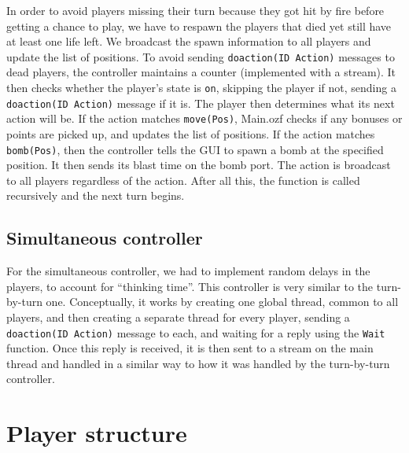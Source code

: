 \documentclass[12pt,journal]{IEEEtran}
\newcommand{\ntt}{\normalfont\ttfamily}
\newcommand{\fn}[1]{{\protect\ntt#1}}
\begin{document}
In order to avoid players missing their turn because they got hit by fire before getting a chance to play, we have to respawn the players that died yet still have at least one life left.
We broadcast the spawn information to all players and update the list of positions.
To avoid sending \lstinline|doaction(ID Action)| messages to dead players, the controller maintains a counter (implemented with a stream).
It then checks whether the player's state is \lstinline|on|, skipping the player if not, sending a \lstinline|doaction(ID Action)| message if it is.
The player then determines what its next action will be.
If the action matches \lstinline|move(Pos)|, \fn{Main.ozf} checks if any bonuses or points are picked up, and updates the list of positions.
If the action matches \lstinline|bomb(Pos)|, then the controller tells the GUI to spawn a bomb at the specified position.
It then sends its blast time on the bomb port.
The action is broadcast to all players regardless of the action.
After all this, the function is called recursively and the next turn begins.

\subsection{Simultaneous controller}
For the simultaneous controller, we had to implement random delays in the players, to account for ``thinking time''.
This controller is very similar to the turn-by-turn one.
Conceptually, it works by creating one global thread, common to all players, and then creating a separate thread for every player, sending a \lstinline|doaction(ID Action)| message to each, and waiting for a reply using the \lstinline|Wait| function.
Once this reply is received, it is then sent to a stream on the main thread and handled in a similar way to how it was handled by the turn-by-turn controller.

\section{Player structure}
\label{sec:player}
\end{document}
